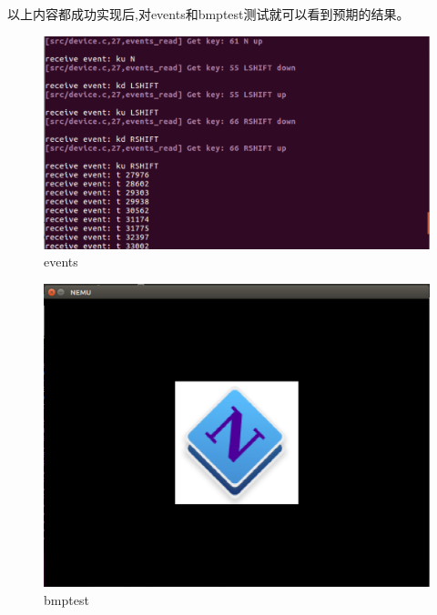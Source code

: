 \documentclass[UTF8,a4paper,10pt]{ctexart}
\begin{document}
{{  以上内容都成功实现后,对events和bmptest测试就可以看到预期的结果。
\begin{figure}[H]
    \centering
    \includegraphics[scale=0.45]{fig/6.png}
    \caption{events}
\end{figure}
\begin{figure}[H]
  \centering
  \includegraphics[scale=0.45]{fig/7.png}
  \caption{bmptest}
\end{figure}
}
}
\end{document}
